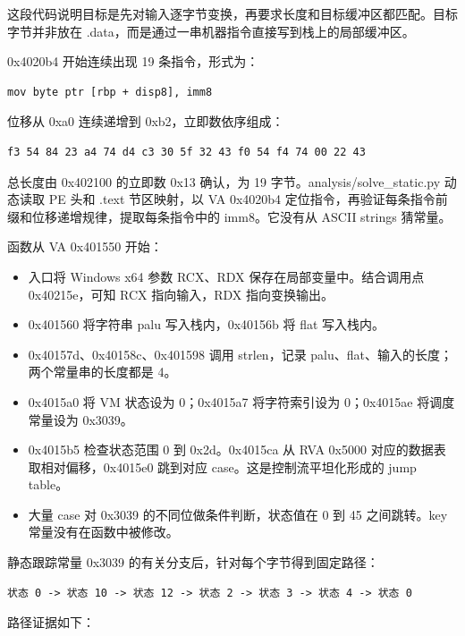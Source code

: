 这段代码说明目标是先对输入逐字节变换，再要求长度和目标缓冲区都匹配。目标字节并非放在 .data，而是通过一串机器指令直接写到栈上的局部缓冲区。

0x4020b4 开始连续出现 19 条指令，形式为：

\begin{verbatim}
mov byte ptr [rbp + disp8], imm8
\end{verbatim}

位移从 0xa0 连续递增到 0xb2，立即数依序组成：

\begin{verbatim}
f3 54 84 23 a4 74 d4 c3 30 5f 32 43 f0 54 f4 74 00 22 43
\end{verbatim}

总长度由 0x402100 的立即数 0x13 确认，为 19 字节。analysis/solve\_static.py 动态读取 PE 头和 .text 节区映射，以 VA 0x4020b4 定位指令，再验证每条指令前缀和位移递增规律，提取每条指令中的 imm8。它没有从 ASCII strings 猜常量。

函数从 VA 0x401550 开始：

\begin{itemize}
\tightlist
\item
  入口将 Windows x64 参数 RCX、RDX 保存在局部变量中。结合调用点 0x40215e，可知 RCX 指向输入，RDX 指向变换输出。
\item
  0x401560 将字符串 palu 写入栈内，0x40156b 将 flat 写入栈内。
\item
  0x40157d、0x40158c、0x401598 调用 strlen，记录 palu、flat、输入的长度；两个常量串的长度都是 4。
\item
  0x4015a0 将 VM 状态设为 0；0x4015a7 将字符索引设为 0；0x4015ae 将调度常量设为 0x3039。
\item
  0x4015b5 检查状态范围 0 到 0x2d。0x4015ca 从 RVA 0x5000 对应的数据表取相对偏移，0x4015e0 跳到对应 case。这是控制流平坦化形成的 jump table。
\item
  大量 case 对 0x3039 的不同位做条件判断，状态值在 0 到 45 之间跳转。key 常量没有在函数中被修改。
\end{itemize}

静态跟踪常量 0x3039 的有关分支后，针对每个字节得到固定路径：

\begin{verbatim}
状态 0 -> 状态 10 -> 状态 12 -> 状态 2 -> 状态 3 -> 状态 4 -> 状态 0
\end{verbatim}

路径证据如下：


